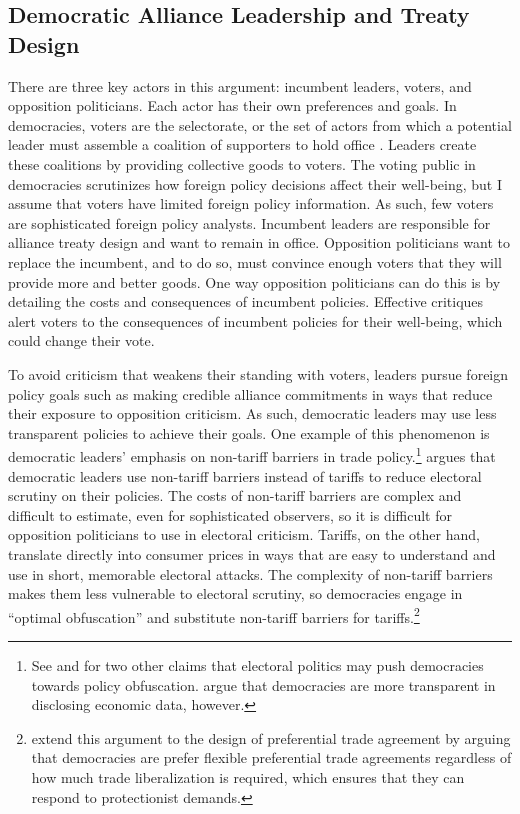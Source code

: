 \documentclass[12pt]{article}
\begin{document}
\subsection{Democratic Alliance Leadership and Treaty Design}


There are three key actors in this argument: incumbent leaders, voters, and opposition politicians. 
Each actor has their own preferences and goals. 
In democracies, voters are the selectorate, or the set of actors from which a potential leader must assemble a coalition of supporters to hold office \citep{BDMetal2002}. 
Leaders create these coalitions by providing collective goods to voters.
The voting public in democracies scrutinizes how foreign policy decisions affect their well-being, but I assume that voters have limited foreign policy information. 
As such, few voters are sophisticated foreign policy analysts. 
Incumbent leaders are responsible for alliance treaty design and want to remain in office.
Opposition politicians want to replace the incumbent, and to do so, must convince enough voters that they will provide more and better goods. 
One way opposition politicians can do this is by detailing the costs and consequences of incumbent policies.
Effective critiques alert voters to the consequences of incumbent policies for their well-being, which could change their vote. 


To avoid criticism that weakens their standing with voters, leaders pursue foreign policy goals such as making credible alliance commitments in ways that reduce their exposure to opposition criticism.
As such, democratic leaders may use less transparent policies to achieve their goals.  
One example of this phenomenon is democratic leaders' emphasis on non-tariff barriers in trade policy.\footnote{See \citet{Rejali2007} and \citet{Stasavage2004} for two other claims that electoral politics may push democracies towards policy obfuscation. \citet{Hollyeretal2011} argue that democracies are more transparent in disclosing economic data, however.}
\citet{Kono2006} argues that democratic leaders use non-tariff barriers instead of tariffs to reduce electoral scrutiny on their policies.
The costs of non-tariff barriers are complex and difficult to estimate, even for sophisticated observers, so it is difficult for opposition politicians to use in electoral criticism. 
Tariffs, on the other hand, translate directly into consumer prices in ways that are easy to understand and use in short, memorable electoral attacks.
The complexity of non-tariff barriers makes them less vulnerable to electoral scrutiny, so democracies engage in ``optimal obfuscation'' and substitute non-tariff barriers for tariffs.\footnote{\citet{Baccinietal2015} extend this argument to the design of preferential trade agreement by arguing that democracies are prefer flexible preferential trade agreements regardless of how much trade liberalization is required, which ensures that they can respond to protectionist demands.}  
\end{document}
